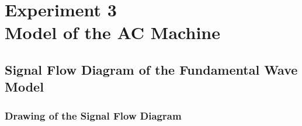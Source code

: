 \documentclass[12pt,a4paper, openany]{book}
\begin{document}




\setcounter{chapter}{2} %
\chapter{Experiment 3 \\  Model of the AC Machine}

 \setcounter{section}{7} %
\section{Signal Flow Diagram of the Fundamental Wave Model}
\subsection{Drawing of the Signal Flow Diagram}
\end{document}
